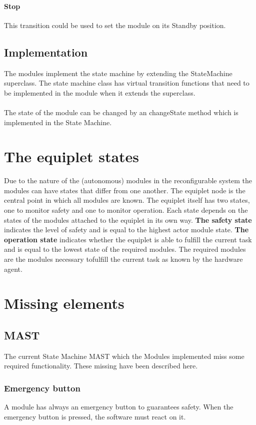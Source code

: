 \documentclass[12pt,a4paper]{report}
\begin{document}
\paragraph{Stop}This transition could be used to set the module on its Standby position.

\subsection{Implementation}
The modules implement the state machine by extending the StateMachine superclass. The state machine class has virtual transition functions that need to be implemented in the module when it extends the superclass.
\\\\
The state of the module can be changed by an changeState method which is implemented in the State Machine.

\newpage
\section{The equiplet states}
Due to the nature of the (autonomous) modules in the reconfigurable system the modules can have states that differ from one another. The equiplet node is the central point in which all modules are known. The equiplet itself has two states, one to monitor safety and one to monitor operation. Each state depends on the states of the modules attached to the equiplet in its own
way.
\textbf{The safety state} indicates the level of safety and is equal to the highest actor module state.
\textbf{The operation state} indicates whether the equiplet is able to fulfill the current task and is equal to the lowest state of the required modules. The required modules are the modules necessary tofulfill the current task as known by the hardware agent.\cite{mast_funcional_design}

\newpage
\section{Missing elements}
\subsection{MAST}
The current State Machine MAST which the Modules implemented miss some required functionality. These missing have been described here.
\subsubsection{Emergency button}
A module has always an emergency button to guarantees safety. When the emergency button is pressed, the software must react on it.
\end{document}
